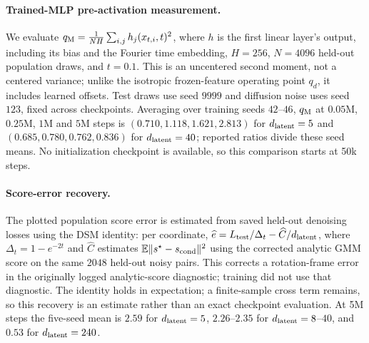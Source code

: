 \paragraph{Trained-MLP pre-activation measurement.}
\label{app:mlp-preactivation}
We evaluate $q_{\rm M}=\frac{1}{NH}\sum_{i,j}h_j(x_{t,i},t)^2$, where $h$ is the first linear layer's output, including its bias and the Fourier time embedding, $H=256$, $N=4096$ held-out population draws, and $t=0.1$. This is an uncentered second moment, not a centered variance; unlike the isotropic frozen-feature operating point $q_d$, it includes learned offsets. Test draws use seed $9999$ and diffusion noise uses seed $123$, fixed across checkpoints. Averaging over training seeds $42$--$46$, $q_{\rm M}$ at $0.05$M, $0.25$M, $1$M and $5$M steps is $(0.710,1.118,1.621,2.813)$ for $d_{\mathrm{latent}}=5$ and $(0.685,0.780,0.762,0.836)$ for $d_{\mathrm{latent}}=40$; reported ratios divide these seed means. No initialization checkpoint is available, so this comparison starts at 50k steps.

\paragraph{Score-error recovery.}
The plotted population score error is estimated from saved held-out denoising losses using the DSM identity: per coordinate, $\widehat e=L_{\rm test}/\Delta_t-\widehat C/d_{\mathrm{latent}}$, where $\Delta_t=1-e^{-2t}$ and $\widehat C$ estimates $\mathbb E\|s^\star-s_{\rm cond}\|^2$ using the corrected analytic GMM score on the same $2048$ held-out noisy pairs. This corrects a rotation-frame error in the originally logged analytic-score diagnostic; training did not use that diagnostic. The identity holds in expectation; a finite-sample cross term remains, so this recovery is an estimate rather than an exact checkpoint evaluation. At 5M steps the five-seed mean is $2.59$ for $d_{\mathrm{latent}}=5$, $2.26$--$2.35$ for $d_{\mathrm{latent}}=8$--$40$, and $0.53$ for $d_{\mathrm{latent}}=240$.


